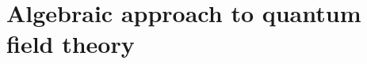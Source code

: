 \documentclass[11pt]{book}
\makeatletter
\newcommand*{\makepagetitle}{%
%
\thispagestyle{empty}
%
{{\raggedright%
%
\vspace*{44pt}%
%
{\LARGE Antoine Géré}\\[\baselineskip]%
%
\vspace*{100pt}%
%
{\Huge\bfseries Algebraic and Noncommutative \\[8pt] approaches to Quantum Field Theory}\\[\baselineskip]%
%
\vspace*{22pt}%
%
{\LARGE Ph.D. thesis}\\[\baselineskip]%
%
\vspace*{44pt}%
%
{\LARGE Dipartimento di Matematica}\\[\baselineskip]%
%
{\LARGE Università degli Studi di Genova}\\[\baselineskip]%
%
\vfill%
%
\newpage%
%
\thispagestyle{empty}%
%
\ \vfill%
%
\textbf{Algebraic and Noncommutative approaches to Quantum Field Theory} \\
Ph.D. thesis submitted by \href{mailto:gere@dima.unige.it}{Antoine Géré} \\
Genova, ???? 2016 \\[8pt]
%
Dipartimento di Matematica \\
Università degli Studi di Genova \\[8pt]
%
Supervisor: \href{mailto:pinamont@dima.unige.it}{Prof. Dr. Nicola Pinamonti} \\
Examiner: ????
%
}}%
%
}%
\theoremstyle{break}
\makeatother
\begin{document}




















\tableofcontents





\part{Algebraic approach to quantum field theory}
\end{document}
